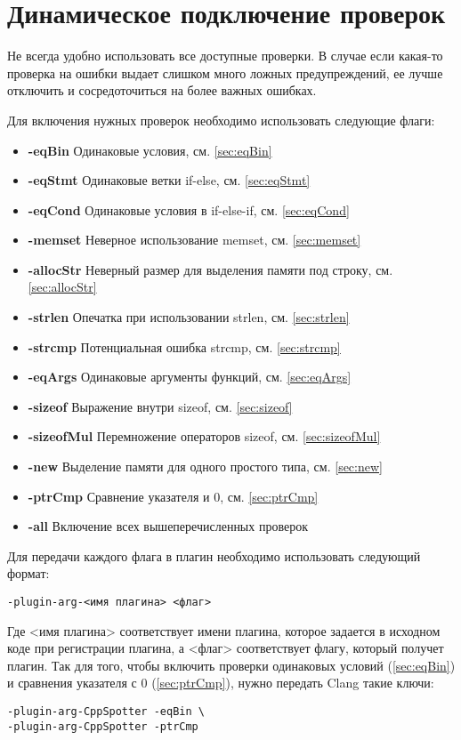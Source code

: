 \section{Динамическое подключение проверок}
Не всегда удобно использовать все доступные проверки. В случае если какая-то проверка на ошибки
выдает слишком много ложных предупреждений, ее лучше отключить и сосредоточиться на более важных
ошибках. 

Для включения нужных проверок необходимо использовать следующие флаги:
\begin{itemize}
	\item \textbf{-eqBin}	Одинаковые условия, см. \ref{sec:eqBin}
	\item \textbf{-eqStmt}	Одинаковые ветки if-else, см. \ref{sec:eqStmt}
	\item \textbf{-eqCond}	Одинаковые условия в if-else-if, см. \ref{sec:eqCond}
	\item \textbf{-memset}	Неверное использование memset, см. \ref{sec:memset}
	\item \textbf{-allocStr}	Неверный размер для выделения памяти под строку, см. \ref{sec:allocStr}
	\item \textbf{-strlen}	Опечатка при использовании strlen, см. \ref{sec:strlen}
	\item \textbf{-strcmp}	Потенциальная ошибка strcmp, см. \ref{sec:strcmp}
	\item \textbf{-eqArgs}	Одинаковые аргументы функций, см. \ref{sec:eqArgs}
	\item \textbf{-sizeof}	Выражение внутри sizeof, см. \ref{sec:sizeof}
	\item \textbf{-sizeofMul}	Перемножение операторов sizeof, см. \ref{sec:sizeofMul}
	\item \textbf{-new}		Выделение памяти для одного простого типа, см. \ref{sec:new}
	\item \textbf{-ptrCmp}	Сравнение указателя и 0, см. \ref{sec:ptrCmp}
	\item \textbf{-all}		Включение всех вышеперечисленных проверок
\end{itemize}

Для передачи каждого флага в плагин необходимо использовать следующий формат:
\begin{lstlisting}
-plugin-arg-<имя плагина> <флаг> 
\end{lstlisting}
Где <имя плагина> соответствует имени плагина, которое задается 
в исходном коде при регистрации плагина, а <флаг> соответствует флагу, который получет плагин.
Так для того, чтобы включить проверки одинаковых условий (\ref{sec:eqBin}) и сравнения указателя с 0 (\ref{sec:ptrCmp}),
нужно передать Clang такие ключи:
\begin{lstlisting}
-plugin-arg-CppSpotter -eqBin \ 
-plugin-arg-CppSpotter -ptrCmp  
\end{lstlisting}


